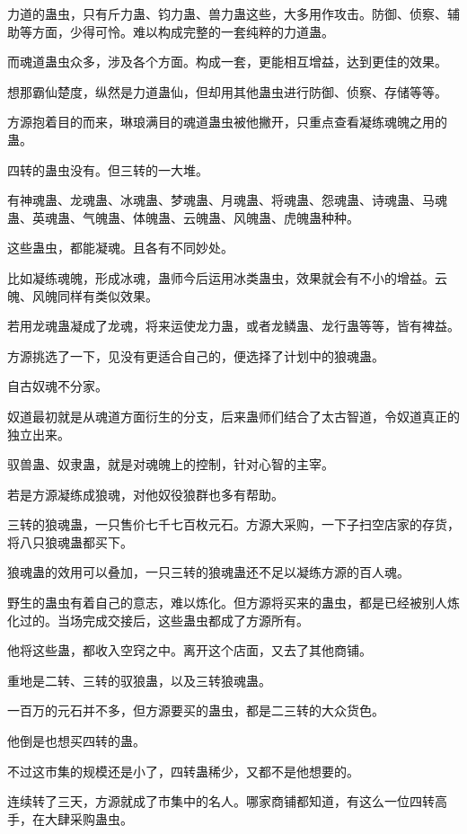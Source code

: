 \begin{this_body}
力道的蛊虫，只有斤力蛊、钧力蛊、兽力蛊这些，大多用作攻击。防御、侦察、辅助等方面，少得可怜。难以构成完整的一套纯粹的力道蛊。

而魂道蛊虫众多，涉及各个方面。构成一套，更能相互增益，达到更佳的效果。

想那霸仙楚度，纵然是力道蛊仙，但却用其他蛊虫进行防御、侦察、存储等等。

方源抱着目的而来，琳琅满目的魂道蛊虫被他撇开，只重点查看凝练魂魄之用的蛊。

四转的蛊虫没有。但三转的一大堆。

有神魂蛊、龙魂蛊、冰魂蛊、梦魂蛊、月魂蛊、将魂蛊、怨魂蛊、诗魂蛊、马魂蛊、英魂蛊、气魄蛊、体魄蛊、云魄蛊、风魄蛊、虎魄蛊种种。

这些蛊虫，都能凝魂。且各有不同妙处。

比如凝练魂魄，形成冰魂，蛊师今后运用冰类蛊虫，效果就会有不小的增益。云魄、风魄同样有类似效果。

若用龙魂蛊凝成了龙魂，将来运使龙力蛊，或者龙鳞蛊、龙行蛊等等，皆有裨益。

方源挑选了一下，见没有更适合自己的，便选择了计划中的狼魂蛊。

自古奴魂不分家。

奴道最初就是从魂道方面衍生的分支，后来蛊师们结合了太古智道，令奴道真正的独立出来。

驭兽蛊、奴隶蛊，就是对魂魄上的控制，针对心智的主宰。

若是方源凝练成狼魂，对他奴役狼群也多有帮助。

三转的狼魂蛊，一只售价七千七百枚元石。方源大采购，一下子扫空店家的存货，将八只狼魂蛊都买下。

狼魂蛊的效用可以叠加，一只三转的狼魂蛊还不足以凝练方源的百人魂。

野生的蛊虫有着自己的意志，难以炼化。但方源将买来的蛊虫，都是已经被别人炼化过的。当场完成交接后，这些蛊虫都成了方源所有。

他将这些蛊，都收入空窍之中。离开这个店面，又去了其他商铺。

重地是二转、三转的驭狼蛊，以及三转狼魂蛊。

一百万的元石并不多，但方源要买的蛊虫，都是二三转的大众货色。

他倒是也想买四转的蛊。

不过这市集的规模还是小了，四转蛊稀少，又都不是他想要的。

连续转了三天，方源就成了市集中的名人。哪家商铺都知道，有这么一位四转高手，在大肆采购蛊虫。


\end{this_body}
